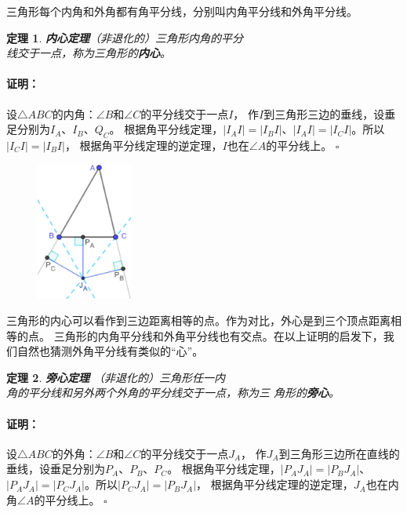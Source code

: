 \documentclass[12pt,UTF8]{ctexbook}
\newtheorem{tm}{定理}[section]
\newenvironment{proof2}{\paragraph{\textbf{证明：}}}{\hfill$\square$}
\begin{document}
三角形每个内角和外角都有角平分线，分别叫内角平分线和外角平分线。

\begin{tm}{\textbf{内心定理}}\label{tm:1-2-0}
    （非退化的）三角形内角的平分\\
    线交于一点，称为三角形的\textbf{内心}。
\end{tm}

\begin{proof2}
    设$\triangle ABC$的内角：$\angle B$和$\angle C$的平分线交于一点$I$，
    作$I$到三角形三边的垂线，设垂足分别为$I_A$、$I_B$、$Q_C$。
    根据角平分线定理，$|I_AI| = |I_BI|$、$|I_AI| = |I_CI|$。所以$|I_CI| = |I_BI|$，
    根据角平分线定理的逆定理，$I$也在$\angle A$的平分线上。
\end{proof2}

\begin{figure} %
    \vspace{-30pt}
    \flushright
    \includegraphics[width=0.28\textwidth]{三角形旁心.png}
\end{figure}

三角形的内心可以看作到三边距离相等的点。作为对比，外心是到三个顶点距离相等的点。
三角形的内角平分线和外角平分线也有交点。在以上证明的启发下，我们自然也猜测外角平分线有类似的“心”。

\begin{tm}{\textbf{旁心定理 }}\label{tm:1-2-1}
    （非退化的）三角形任一内\\
    角的平分线和另外两个外角的平分线交于一点，称为三
    角形的\textbf{旁心}。
\end{tm}

\begin{proof2}
    设$\triangle ABC$的外角：$\angle B$和$\angle C$的平分线交于一点$J_A$，
    作$J_A$到三角形三边所在直线的垂线，设垂足分别为$P_A$、$P_B$、$P_C$。
    根据角平分线定理，$|P_AJ_A| = |P_BJ_A|$、$|P_AJ_A| = |P_CJ_A|$。所以$|P_CJ_A| = |P_BJ_A|$，
    根据角平分线定理的逆定理，$J_A$也在内角$\angle A$的平分线上。
\end{proof2}
\end{document}
